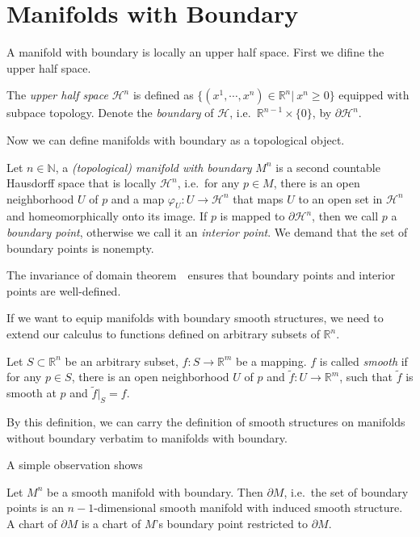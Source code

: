 \section{Manifolds with Boundary}

A manifold with boundary is locally an upper half space.
First we difine the upper half space.

\begin{defn}
    The \emph{upper half space} $\mathcal{H}^n$ is defined as $\{(x^1,\cdots,x^n)\in\mathbb{R}^n|\ x^n\geq 0\}$ equipped with subpace topology.
    Denote the \emph{boundary} of $\mathcal{H}$, i.e.\ $\mathbb{R}^{n-1}\times\{0\}$, by $\partial\mathcal{H}^n$.
\end{defn}

Now we can define manifolds with boundary as a topological object.
\begin{defn}
    Let $n\in\mathbb{N}$, a \emph{(topological) manifold with boundary} $M^n$ is a second countable Hausdorff space that is locally $\mathcal{H}^n$, i.e.\ for any $p\in M$, there is an open neighborhood $U$ of $p$ and a map $\varphi_U:U\to\mathcal{H}^n$ that maps $U$ to an open set in $\mathcal{H}^n$ and homeomorphically onto its image.
    If $p$ is mapped to $\partial\mathcal{H}^n$, then we call $p$ a \emph{boundary point}, otherwise we call it an \emph{interior point}.
    We demand that the set of boundary points is nonempty.
\end{defn}

\begin{rem}
    The invariance of domain theorem~\cite[Theorem~2B.3]{Hatcher}~ensures that boundary points and interior points are well-defined.
\end{rem}

If we want to equip manifolds with boundary smooth structures, we need to extend our calculus to functions defined on arbitrary subsets of $\mathbb{R}^n$.

\begin{defn}
    Let $S\subset\mathbb{R}^n$ be an arbitrary subset, $f:S\to\mathbb{R}^m$ be a mapping.
    $f$ is called \emph{smooth} if for any $p\in S$, there is an open neighborhood $U$ of $p$ and $\tilde{f}:U\to\mathbb{R}^m$, such that $\tilde{f}$ is smooth at $p$ and $\tilde{f}|_S=f$.
\end{defn}

By this definition, we can carry the definition of smooth structures on manifolds without boundary verbatim to manifolds with boundary.

A simple observation shows
\begin{lem}
    Let $M^n$ be a smooth manifold with boundary.
    Then $\partial M$, i.e.\ the set of boundary points is an $n-1$-dimensional smooth manifold with induced smooth structure.
    A chart of $\partial M$ is a chart of $M$'s boundary point restricted to $\partial M$.
\end{lem}

